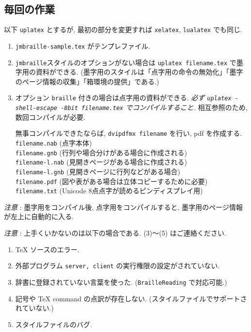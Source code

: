 \documentclass[lualatex,ja=standard,jafont=haranoaji]{bxjsarticle}
\def\rem{\par\emph{注意} : }
\begin{document}
\subsection{毎回の作業}
以下 \texttt{uplatex} とするが, 最初の部分を変更すれば \texttt{xelatex}, \texttt{lualatex} でも同じ.
\begin{enumerate}
\item \verb|jmbraille-sample.tex| がテンプレファイル.
\item \verb|jmbraille|スタイルのオプションがない場合は
  \verb|uplatex filename.tex| で墨字用の資料ができる. (墨字用のスタイルは「点字用の命令の無効化」「墨字のページ情報の収集」「箱環境の提供」である.)
\item オプション \verb|braille| 付きの場合は点字用の資料ができる.
  \emph{必ず \texttt{uplatex -shell-escape -8bit filename.tex} でコンパイルすること.}  相互参照のため, 数回コンパイルが必要.

  無事コンパイルできたならば, \verb|dvipdfmx filename| を行い, pdf を作成する.\\
  \verb|filename.nab| (点字本体) \\
  \verb|filename.gnb| (行列や場合分けがある場合に作成される)\\
  \verb|filename-l.nab| (見開きページがある場合に作成される)\\
  \verb|filename-l.gnb| (見開きページに行列などがある場合) \\
  \verb|filename.pdf| (図や表がある場合は立体コピーするために必要)\\
  \verb|filename.txt| (Unicode 8点点字が読めるピンディスプレイ用)
\end{enumerate}

\rem 墨字用をコンパイル後,
 点字用をコンパイルすると, 墨字用のページ情報が左上に自動的に入る. 

\rem
  上手くいかないのは以下の場合である. (3)〜(5) はご連絡ください.
  \begin{enumerate}
  \item TeX ソースのエラー.
  \item 外部プログラム \texttt{server, client} の実行権限の設定がされていない.
  \item 辞書に登録されていない言葉を使った. (\verb|BrailleReading| で対応可能.)
  \item 記号や TeX command の点訳が存在しない. (スタイルファイルでサポートされていない.)
  \item スタイルファイルのバグ.
  \end{enumerate}
\end{document}
